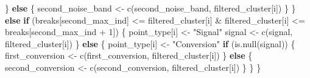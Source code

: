 \documentclass[
]{article}
\newenvironment{Shaded}{\begin{snugshade}}{\end{snugshade}}
\newcommand{\ControlFlowTok}[1]{\textcolor[rgb]{0.13,0.29,0.53}{\textbf{#1}}}
\newcommand{\DecValTok}[1]{\textcolor[rgb]{0.00,0.00,0.81}{#1}}
\newcommand{\FunctionTok}[1]{\textcolor[rgb]{0.00,0.00,0.00}{#1}}
\newcommand{\NormalTok}[1]{#1}
\newcommand{\OtherTok}[1]{\textcolor[rgb]{0.56,0.35,0.01}{#1}}
\newcommand{\SpecialCharTok}[1]{\textcolor[rgb]{0.00,0.00,0.00}{#1}}
\newcommand{\StringTok}[1]{\textcolor[rgb]{0.31,0.60,0.02}{#1}}
\begin{document}
\begin{Shaded}
\begin{Highlighting}[]
\NormalTok{        \} }\ControlFlowTok{else}\NormalTok{ \{}
\NormalTok{            second\_noise\_band }\OtherTok{\textless{}{-}} \FunctionTok{c}\NormalTok{(second\_noise\_band, filtered\_cluster[i])}
\NormalTok{        \}}
\NormalTok{    \} }\ControlFlowTok{else} \ControlFlowTok{if}\NormalTok{ (breaks[second\_max\_ind] }\SpecialCharTok{\textless{}=}\NormalTok{ filtered\_cluster[i] }\SpecialCharTok{\&}\NormalTok{ filtered\_cluster[i] }\SpecialCharTok{\textless{}=} 
\NormalTok{        breaks[second\_max\_ind }\SpecialCharTok{+} \DecValTok{1}\NormalTok{]) \{}
\NormalTok{        point\_type[i] }\OtherTok{\textless{}{-}} \StringTok{"Signal"}
\NormalTok{        signal }\OtherTok{\textless{}{-}} \FunctionTok{c}\NormalTok{(signal, filtered\_cluster[i])}
\NormalTok{    \} }\ControlFlowTok{else}\NormalTok{ \{}
\NormalTok{        point\_type[i] }\OtherTok{\textless{}{-}} \StringTok{"Conversion"}
        \ControlFlowTok{if}\NormalTok{ (}\FunctionTok{is.null}\NormalTok{(signal)) \{}
\NormalTok{            first\_conversion }\OtherTok{\textless{}{-}} \FunctionTok{c}\NormalTok{(first\_conversion, filtered\_cluster[i])}
\NormalTok{        \} }\ControlFlowTok{else}\NormalTok{ \{}
\NormalTok{            second\_conversion }\OtherTok{\textless{}{-}} \FunctionTok{c}\NormalTok{(second\_conversion, filtered\_cluster[i])}
\NormalTok{        \}}
\NormalTok{    \}}
\NormalTok{\}}
\end{Highlighting}
\end{Shaded}
\end{document}
